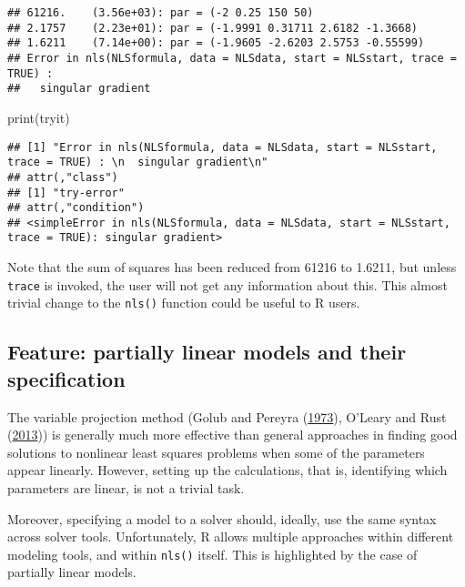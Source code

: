 \documentclass[
]{article}
\newenvironment{Shaded}{\begin{snugshade}}{\end{snugshade}}
\newcommand{\FunctionTok}[1]{\textcolor[rgb]{0.00,0.00,0.00}{#1}}
\newcommand{\NormalTok}[1]{#1}
\begin{document}
\begin{verbatim}
## 61216.    (3.56e+03): par = (-2 0.25 150 50)
## 2.1757    (2.23e+01): par = (-1.9991 0.31711 2.6182 -1.3668)
## 1.6211    (7.14e+00): par = (-1.9605 -2.6203 2.5753 -0.55599)
## Error in nls(NLSformula, data = NLSdata, start = NLSstart, trace = TRUE) : 
##   singular gradient
\end{verbatim}

\begin{Shaded}
\begin{Highlighting}[]
\FunctionTok{print}\NormalTok{(tryit)}
\end{Highlighting}
\end{Shaded}

\begin{verbatim}
## [1] "Error in nls(NLSformula, data = NLSdata, start = NLSstart, trace = TRUE) : \n  singular gradient\n"
## attr(,"class")
## [1] "try-error"
## attr(,"condition")
## <simpleError in nls(NLSformula, data = NLSdata, start = NLSstart, trace = TRUE): singular gradient>
\end{verbatim}

Note that the sum of squares has been reduced from 61216 to 1.6211, but
unless \texttt{trace} is invoked, the user will not get any information
about this. This almost trivial change to the \texttt{nls()} function
could be useful to R users.

\hypertarget{feature-partially-linear-models-and-their-specification}{%
\subsection{Feature: partially linear models and their
specification}\label{feature-partially-linear-models-and-their-specification}}

The variable projection method (Golub and Pereyra
(\protect\hyperlink{ref-Golub1973}{1973}), O'Leary and Rust
(\protect\hyperlink{ref-OlearyRust13}{2013})) is generally much more
effective than general approaches in finding good solutions to nonlinear
least squares problems when some of the parameters appear linearly.
However, setting up the calculations, that is, identifying which
parameters are linear, is not a trivial task.

Moreover, specifying a model to a solver should, ideally, use the same
syntax across solver tools. Unfortunately, R allows multiple approaches
within different modeling tools, and within \texttt{nls()} itself. This
is highlighted by the case of partially linear models.
\end{document}
